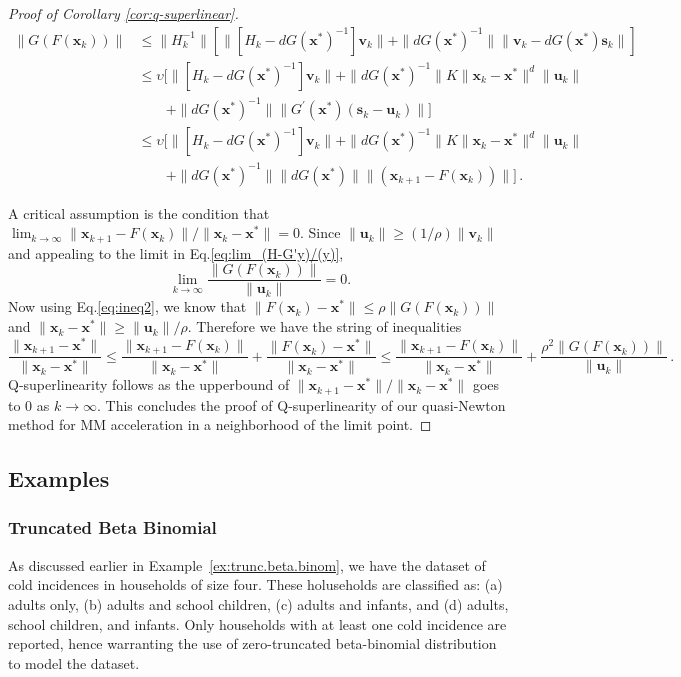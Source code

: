 \documentclass{statsoc}
\newcommand{\bs}{\boldsymbol{s}}
\newcommand{\bu}{\boldsymbol{u}}
\newcommand{\bv}{\boldsymbol{v}}
\newcommand{\bx}{\boldsymbol{x}}
\begin{document}
\begin{proof}[Proof of Corollary \ref{cor:q-superlinear}]
\begin{align} \label{eq:G(F(x))_upperbound}
    \|G(F(\bx_{k}))\| &\leq \|H_k^{-1}\|\left[ \|[H_k - dG(\bx^\ast)^{-1}]\bv_k\| + \|dG(\bx^\ast)^{-1}\| \|\bv_k - dG(\bx^\ast)\bs_k\| \right] \nonumber \\
    & \leq \upsilon \big[ \|[H_k - dG(\bx^\ast)^{-1}]\bv_k\| +  \|dG(\bx^\ast)^{-1}\| K \|\bx_k - \bx^\ast\|^d \|\bu_k\| \nonumber 
    \\ & \qquad + \|dG(\bx^\ast)^{-1}\| \|G^{\prime} (\bx^\ast) (\bs_k - \bu_k)\| \big] \nonumber 
    \\ &\leq \upsilon \big[ \|[H_k - dG(\bx^\ast)^{-1}]\bv_k\| + \|dG(\bx^\ast)^{-1}\| K \|\bx_k - \bx^\ast\|^d \|\bu_k\| \nonumber
    \\  & \qquad + \|dG(\bx^\ast)^{-1}\| \|dG(\bx^\ast)\| \|(\bx_{k+1} - F(\bx_k) )\| \big] \, .
\end{align}


A critical assumption is the condition that $\lim_{k \to \infty} \|\bx_{k+1} - F(\bx_k)\|/\|\bx_k - \bx^\ast\| = 0$. Since $\|\bu_k\| \geq (1/\rho)\|\bv_k\|$ and appealing to the limit in Eq.\eqref{eq:lim_(H-G'y)/(y)},
\
\[
\lim_{k \to \infty} \dfrac{\|G(F(\bx_{k}))\|}{\|\bu_k\|} = 0 .
\]
Now using Eq.\eqref{eq:ineq2}, we know that $\|F(\bx_k) - \bx^\ast\| \leq \rho\| G(F(\bx_k))\|$ and $\|\bx_k - \bx^\ast\| \geq \|\bu_k\|/\rho$. Therefore we have the string of inequalities
\[
\dfrac{\|\bx_{k+1} - \bx^\ast\|}{\|\bx_{k} - \bx^\ast\|} \leq \dfrac{\|\bx_{k+1} - F(\bx_k)\|}{\|\bx_{k} - \bx^\ast\|} + \dfrac{\|F(\bx_k) - \bx^\ast\|}{\|\bx_{k} - \bx^\ast\|} \leq \dfrac{\|\bx_{k+1} - F(\bx_k)\|}{\|\bx_{k} - \bx^\ast\|} + \dfrac{\rho^2\| G(F(\bx_k))\|}{\|\bu_k\|}\,.
\]
Q-superlinearity follows as the upperbound of ${\|\bx_{k+1} - \bx^\ast\|}/{\|\bx_{k} - \bx^\ast\|}$ goes to $0$ as $k \to \infty$. This concludes the proof of Q-superlinearity of our quasi-Newton method for MM acceleration in a neighborhood of the limit point.
\end{proof}


\subsection{Examples}

\subsubsection{Truncated Beta Binomial}

As discussed earlier in Example~\ref{ex:trunc.beta.binom}, we have the \cite{lidwell1951observations} dataset of cold incidences in households of size four. These holuseholds are classified as: (a) adults only, (b) adults and school children, (c) adults and infants, and (d) adults, school children, and infants. Only households with at least one cold incidence are reported, hence warranting the use of zero-truncated beta-binomial distribution to model the dataset.
\end{document}
